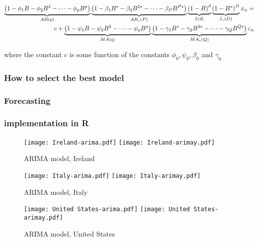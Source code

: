 \begin{align}
\underbrace{\left(1-\phi_1 B-\phi_2B^2-\dots-\phi_p B^p\right)}_{AR(p)}
\underbrace{\left(1-\beta_1 B^s-\beta_2B^{2s}-\dots-\beta_P B^{Ps}\right)}_{AR_s(P)} 
\underbrace{\left(1-B\right)^d}_{I(d)}\underbrace{\left(1-B^s\right)^D}_{I_s(D)}   x_n = \nonumber \\
 c+
\underbrace{\left(1-\psi_1 B-\psi_2B^2-\dots-\psi_q B^q\right)}_{MA(q)}
\underbrace{\left(1-\gamma_1 B^s-\gamma_2B^{2s}-\dots-\gamma_Q B^{Qs}\right)}_{MA_s(Q)} \varepsilon_n
\end{align}

where the constant $c$ is some function of the constants $\phi_0,\psi_0,\beta_0$ and $\gamma_0$ 

\subsubsection{How to select the best model}

\subsubsection{Forecasting}

\subsubsection{implementation in R}


\begin{figure}[H]
  \texttt{[image: Ireland-arima.pdf]} \label{fig:ireland-arima}
\endminipage\hfill
{}
  \texttt{[image: Ireland-arimay.pdf]} \label{fig:ireland-arimay}
\endminipage
\caption{ARIMA model, Ireland}
\end{figure}

\begin{figure}[H]
  \texttt{[image: Italy-arima.pdf]} \label{fig:italy-arima}
\endminipage\hfill
{}
  \texttt{[image: Italy-arimay.pdf]} \label{fig:italy-arimay}
\endminipage
\caption{ARIMA model, Italy}
\end{figure}

\begin{figure}[H]
  \texttt{[image: United States-arima.pdf]} \label{fig:usa-arima}
\endminipage\hfill
{}
  \texttt{[image: United States-arimay.pdf]} \label{fig:usa-arimay}
\endminipage
\caption{ARIMA model, United States}
\end{figure}

